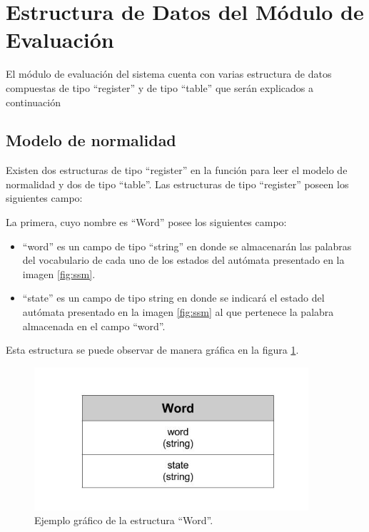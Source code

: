\section*{Estructura de Datos del Módulo de Evaluación}

El módulo de evaluación del sistema cuenta con varias estructura de datos compuestas de tipo ``register'' y de tipo ``table'' que serán explicados a continuación 

\subsection*{Modelo de normalidad}
\label{sssec:estructuraModelo}

Existen dos estructuras de tipo ``register'' en la función para leer el modelo de normalidad y dos de tipo ``table''.
Las estructuras de tipo ``register'' poseen los siguientes campo:

La primera, cuyo nombre es ``Word'' posee los siguientes campo:
\begin{itemize}
\item ``word'' es un campo de tipo ``string'' en donde se almacenarán las palabras del vocabulario de cada uno de los estados del autómata presentado en la imagen \ref{fig:ssm}.
\item ``state'' es un campo de tipo string en donde se indicará el estado del autómata presentado en la imagen \ref{fig:ssm} al que pertenece la palabra almacenada en el campo ``word''.
\end{itemize}

Esta estructura se puede observar de manera gráfica en la figura \ref{fig:WORD}.

\begin{figure}[!htb]
\begin{center}
\includegraphics[width=4in]{./img/Word.jpg}
\caption{Ejemplo gráfico de la estructura ``Word''.}
\label{fig:WORD}
\end{center}
\end{figure}	

